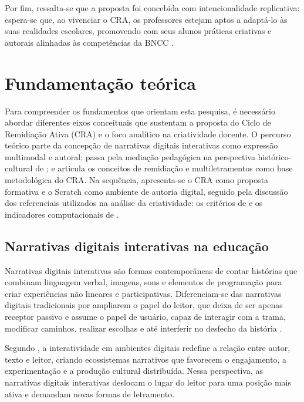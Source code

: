 \documentclass[portuguese]{textolivre}
\begin{document}
Por fim, ressalta-se que a proposta foi concebida com intencionalidade replicativa: espera-se que, ao vivenciar o CRA, os professores estejam aptos a adaptá-lo às suas realidades escolares, promovendo com seus alunos práticas criativas e autorais alinhadas às competências da BNCC \cite{bncc2018,cne2022}.

\section{Fundamentação teórica}\label{sec-fundamentacao}

Para compreender os fundamentos que orientam esta pesquisa, é necessário abordar diferentes eixos conceituais que sustentam a proposta do Ciclo de Remidiação Ativa (CRA) e o foco analítico na criatividade docente. O percurso teórico parte da concepção de narrativas digitais interativas como expressão multimodal e autoral; passa pela mediação pedagógica na perspectiva histórico-cultural de \textcite{vygotsky2007}; e articula os conceitos de remidiação e multiletramentos como base metodológica do CRA. Na sequência, apresenta-se o CRA como proposta formativa e o Scratch como ambiente de autoria digital, seguido pela discussão dos referenciais utilizados na análise da criatividade: os critérios de \textcite{torrance1995} e os indicadores computacionais de \textcite{brennan2012}.

\subsection{Narrativas digitais interativas na educação}

Narrativas digitais interativas são formas contemporâneas de contar histórias que combinam linguagem verbal, imagens, sons e elementos de programação para criar experiências não lineares e participativas. Diferenciam-se das narrativas digitais tradicionais por ampliarem o papel do leitor, que deixa de ser apenas receptor passivo e assume o papel de usuário, capaz de interagir com a trama, modificar caminhos, realizar escolhas e até interferir no desfecho da história \cite{ryan2009}.

Segundo \textcite{jenkins2006}, a interatividade em ambientes digitais redefine a relação entre autor, texto e leitor, criando ecossistemas narrativos que favorecem o engajamento, a experimentação e a produção cultural distribuída. Nessa perspectiva, as narrativas digitais interativas deslocam o lugar do leitor para uma posição mais ativa e demandam novas formas de letramento.
\end{document}
